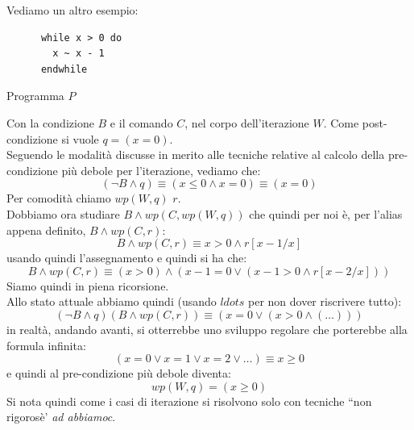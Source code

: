 				      				\begin{esempio}
				      					Vediamo un altro esempio:
				      					\begin{listing}[H]
				      						\begin{lstlisting}
      while x > 0 do
        x ~ x - 1
      endwhile
				      						\end{lstlisting}
				      						\caption{Programma $P$}
				      					\end{listing}
				      					Con la condizione $B$ e il comando $C$, nel corpo dell'iterazione $W$. Come
				      					post-condizione si vuole $q=(x=0)$.\\
				      					Seguendo le modalità discusse in merito alle tecniche relative al calcolo
				      					della pre-condizione più debole per l'iterazione, vediamo che:
				      					\[(\neg B\land q)\equiv (x\leq 0\land x=0)\equiv (x=0)\]
				      					Per comodità chiamo $wp(W, q)$ $r$.\\ 
				      					Dobbiamo ora studiare $B\land wp(C, wp(W, q))$ che quindi per noi è, per l'alias
				      					appena definito, $B\land wp(C, r)$:
				      					\[B\land wp(C, r)\equiv x>0\land r[x-1/x]\]
				      					usando quindi l'assegnamento e quindi si ha che:
				      					\[B\land wp(C, r)\equiv (x>0)\land (x-1=0\lor (x-1>0\land r[x-2/x]))\]
				      					Siamo quindi in piena ricorsione.\\
				      					Allo stato attuale abbiamo quindi (usando $ldots$ per non dover riscrivere tutto):
				      					\[(\neg B\land q)(B\land wp(C, r))\equiv (x=0 \lor(x>0\land(\ldots)))\]
				      					in realtà, andando avanti, si otterrebbe uno sviluppo regolare che porterebbe
				      					alla formula infinita:
				      					\[(x=0\lor x=1\lor x=2\lor \ldots)\equiv x\geq 0\]
				      					e quindi al pre-condizione più debole diventa:
				      					\[wp(W, q)=(x\geq 0)\]
				      					Si nota quindi come i casi di iterazione si risolvono solo con tecniche ``non
				      					rigorosè' \textit{ad abbiamoc}.
				      				\end{esempio}
